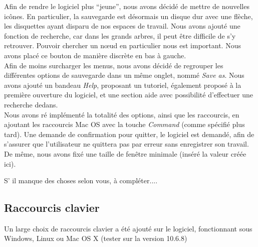\documentclass[12pt, a4paper]{article}
\begin{document}
Afin de rendre le logiciel plus ``jeune'', nous avons décidé de mettre de nouvelles icônes. En particulier, la sauvegarde est désormais un disque dur avec une flèche, les disquettes ayant disparu de nos espaces de travail. Nous avons ajouté une fonction de recherche, car dans les grands arbres, il peut être difficile de s'y retrouver. Pouvoir chercher un nœud en particulier nous est important. Nous avons placé ce bouton de manière discrète en bas à gauche.\\


Afin de moins surcharger les menus, nous avons décidé de regrouper les différentes options de sauvegarde dans un même onglet, nommé \emph{Save as}. Nous avons ajouté un bandeau \emph{Help}, proposant un tutoriel, également proposé à la première ouverture du logiciel, et une section aide avec possibilité d'effectuer une recherche dedans.\\


Nous avons ré implémenté la totalité des options, ainsi que les raccourcis, en ajoutant les raccourcis Mac OS avec la touche \emph{Command} (comme spécifié plus tard). Une demande de confirmation pour quitter, le logiciel est demandé, afin de s'assurer que l'utilisateur ne quittera pas par erreur sans enregistrer son travail. De même, nous avons fixé une taille de fenêtre minimale (inséré la valeur créée ici).

S’ il manque des choses selon vous, à compléter....
\textcolor{NavyBlue}{\subsection{Raccourcis clavier}}

Un large choix de raccourcis clavier a été ajouté sur le logiciel, fonctionnant sous Windows, Linux ou Mac OS X (tester sur la version 10.6.8)
\end{document}
